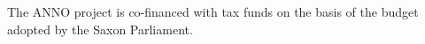 \documentclass[sw]{iosart2x}
\begin{document}


\begin{ack}
The ANNO project is co-financed with tax funds on the basis of the budget adopted by the Saxon Parliament.
\end{ack}

\nocite{*}


\end{document}
